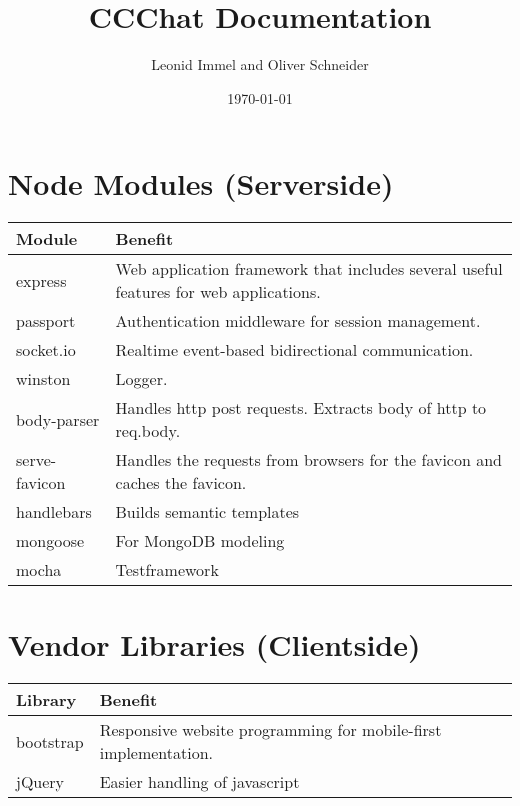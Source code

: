 \documentclass[10pt,a4paper,landscape]{article}
\title{CCChat Documentation}
\date{\today}
\author{Leonid Immel and Oliver Schneider}
\begin{document}
\maketitle
\tableofcontents

\section{Node Modules (Serverside)}
\begin{tabularx}{\textwidth}{ll}
    \textbf{Module} & \textbf{Benefit}               \\
    \toprule
    express         & Web application framework that includes several useful features for web applications. \\ 
    \midrule
    passport        & Authentication middleware for session management. \\
    \midrule
    socket.io       & Realtime event-based bidirectional communication. \\
    \midrule
    winston         & Logger. \\
    \midrule
    body-parser     & Handles http post requests. Extracts body of http to req.body. \\
    \midrule
    serve-favicon   & Handles the requests from browsers for the favicon and caches the favicon. \\
    \midrule
    handlebars      & Builds semantic templates \\
    \midrule
    mongoose        & For MongoDB modeling \\
    \midrule
    mocha           & Testframework \\
    \bottomrule
\end{tabularx}

\section{Vendor Libraries (Clientside)}
\begin{tabularx}{\textwidth}{ll}
    \textbf{Library}& \textbf{Benefit}       \\
    \toprule
    bootstrap       & Responsive website programming for mobile-first implementation.\\
    \midrule
    jQuery          & Easier handling of javascript \\
    \bottomrule
\end{tabularx}
    
\end{document}
